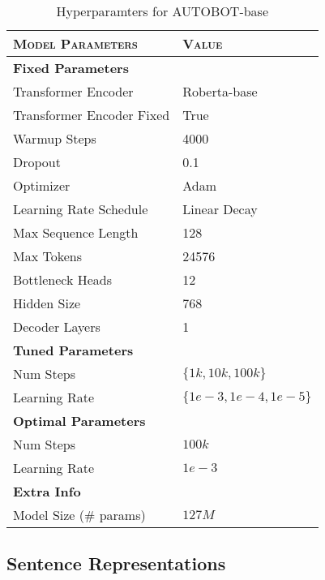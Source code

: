 \begin{table}[h]
    \small
    \centering
    \begin{tabular}{ll}
        \toprule
        \textsc{Model Parameters} & \textsc{Value} \\
        \midrule
        \textbf{Fixed Parameters} & {} \\
        \midrule
        Transformer Encoder & Roberta-base \\
        Transformer Encoder Fixed & True \\
        Warmup Steps & 4000 \\
        Dropout & 0.1 \\
        Optimizer & Adam \\
        Learning Rate Schedule & Linear Decay \\
        Max Sequence Length & 128 \\
        Max Tokens & 24576 \\
        Bottleneck Heads & 12 \\
        Hidden Size & 768 \\
        Decoder Layers & 1 \\
        \midrule
        \textbf{Tuned Parameters} & {} \\
        \midrule
        Num Steps & $\{1k, 10k, 100k\}$ \\
        Learning Rate & $\{1e-3, 1e-4, 1e-5\}$ \\
        \midrule
        \textbf{Optimal Parameters} & {} \\
        \midrule
        Num Steps & $100k$ \\
        Learning Rate & $1e-3$ \\
        \midrule
        \textbf{Extra Info} & {} \\
        \midrule
        Model Size (\# params) & $127M$ \\
        \bottomrule
    \end{tabular}
    \caption{\label{tab:autobotbase}Hyperparamters for \textsc{AUTOBOT}-base}

\end{table}


\subsection{Sentence Representations}\label{adx:sentrep}

